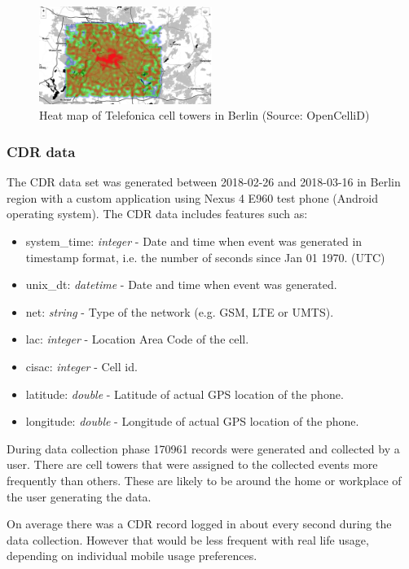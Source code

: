 \begin{figure}[h]
    \includegraphics[width=0.5\textwidth]{images/opencellid.png}
    \caption{Heat map of Telefonica cell towers in Berlin (Source: OpenCelliD) }
    \label{fig:opencellid}
\end{figure}

\subsubsection{CDR data}
The CDR data set was generated between 2018-02-26 and 2018-03-16 in Berlin region with a custom application using Nexus 4 E960 test phone (Android operating system). The CDR data includes features such as:
\begin{itemize}
\item system\_time: \textit{integer} - Date and time when event was generated in timestamp format, i.e. the number of seconds since Jan 01 1970. (UTC)
\item unix\_dt: \textit{datetime} - Date and time when event was generated.
\item net: \textit{string} - Type of the network (e.g. GSM, LTE or UMTS).
\item lac: \textit{integer} - Location Area Code of the cell.
\item cisac: \textit{integer} - Cell id.
\item latitude: \textit{double} - Latitude of actual GPS location of the phone.
\item longitude: \textit{double} - Longitude of actual GPS location of the phone.
\end{itemize}

During data collection phase 170961 records were generated and collected by a user. There are cell towers that were assigned to the collected events more frequently than others. These are likely to be around the home or workplace of the user generating the data.

On average there was a CDR record logged in about every second during the data collection. However that would be less frequent with real life usage, depending on individual mobile usage preferences. 

